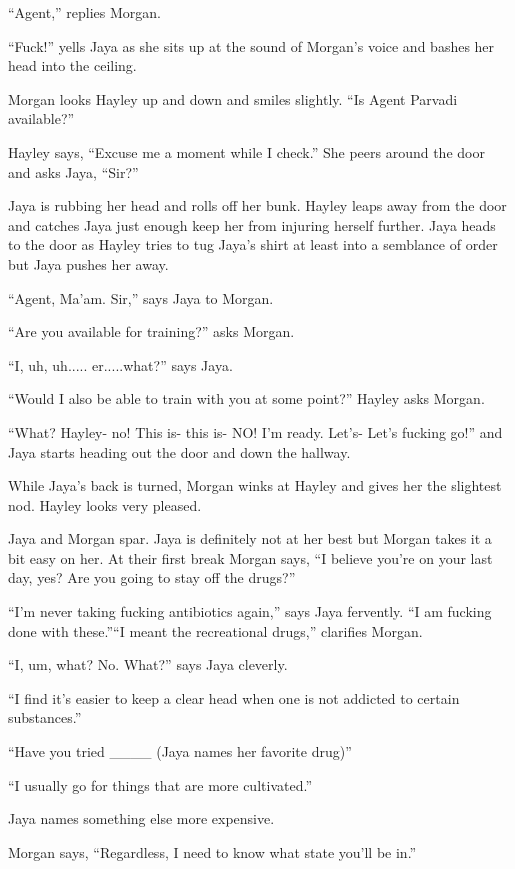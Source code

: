 ``Agent,'' replies Morgan.

``Fuck!'' yells Jaya as she sits up at the sound of Morgan's voice and bashes her head into the ceiling.

Morgan looks Hayley up and down and smiles slightly.  ``Is Agent Parvadi available?''

Hayley says, ``Excuse me a moment while I check.''  She peers around the door and asks Jaya, ``Sir?''

Jaya is rubbing her head and rolls off her bunk.  Hayley leaps away from the door and catches Jaya just enough keep her from injuring herself further.  Jaya heads to the door as Hayley tries to tug Jaya's shirt at least into a semblance of order but Jaya pushes her away. 

``Agent, Ma'am. Sir,'' says Jaya to Morgan.

``Are you available for training?'' asks Morgan.

``I, uh, uh..... er.....what?'' says Jaya.

``Would I also be able to train with you at some point?'' Hayley asks Morgan.

``What?  Hayley- no!  This is- this is- NO!   I'm ready.  Let's- Let's fucking go!'' and Jaya starts heading out the door and down the hallway.

While Jaya's back is turned, Morgan winks at Hayley and gives her the slightest nod.  Hayley looks very pleased.



Jaya and Morgan spar.  Jaya is definitely not at her best but Morgan takes it a bit easy on her.  At their first break Morgan says, ``I believe you're on your last day, yes?  Are you going to stay off the drugs?''

``I'm never taking fucking antibiotics again,'' says Jaya fervently.  ``I am fucking done with these.''``I meant the recreational drugs,'' clarifies Morgan.

``I, um, what? No.  What?'' says Jaya cleverly.

``I find it's easier to keep a clear head when one is not addicted to certain substances.''

``Have you tried \_\_\_\_ (Jaya names her favorite drug)''

``I usually go for things that are more cultivated.''

Jaya names something else more expensive.

Morgan says, ``Regardless, I need to know what state you'll be in.''

